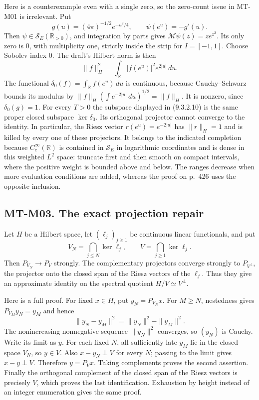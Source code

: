 Here is a counterexample even with a single zero, so the zero-count issue
in MT-M01 is irrelevant.  Put
\[
 g(u)=(4\pi)^{-1/2}e^{-u^2/4},\qquad
 \psi(e^u)=-g'(u).
\]
Then $\psi\in\mathcal S_E(\mathbb R_{>0})$, and integration by parts gives
$\mathcal M\psi(z)=z e^{z^2}$.  Its only zero is $0$, with multiplicity one,
strictly inside the strip for $I=[-1,1]$.  Choose Sobolev index $0$.
The draft's Hilbert norm is then
\[
 \|f\|_H^2=\int_{\mathbb R}|f(e^u)|^2e^{2|u|}\,du.
\]
The functional $\delta_0(f)=\int_{\mathbb R}f(e^u)\,du$ is continuous,
because Cauchy--Schwarz bounds its modulus by
$\|f\|_H(\int e^{-2|u|}\,du)^{1/2}=\|f\|_H$.
It is nonzero, since $\delta_0(g)=1$.  For every $T>0$ the subspace displayed
in (9.3.2.10) is the same proper closed subspace $\ker\delta_0$.
Its orthogonal projector cannot converge to the identity.  In particular,
the Riesz vector $r(e^u)=e^{-2|u|}$ has $\|r\|_H=1$ and is killed by every
one of these projectors.  It belongs to the indicated completion because
$C_c^\infty(\mathbb R)$ is contained in $\mathcal S_E$ in logarithmic
coordinates and is dense in this weighted $L^2$ space: truncate first and
then smooth on compact intervals, where the positive weight is bounded
above and below.  The ranges decrease when more evaluation
conditions are added, whereas the proof on p.~426 uses the opposite
inclusion.

\subsection*{MT-M03. The exact projection repair}
Let $H$ be a Hilbert space, let $(\ell_j)_{j\ge1}$ be continuous linear
functionals, and put
\[
 V_N=\bigcap_{j\le N}\ker\ell_j,\qquad V=\bigcap_{j\ge1}\ker\ell_j.
\]
Then $P_{V_N}\to P_V$ strongly.  The complementary projectors converge
strongly to $P_{V^\perp}$, the projector onto the closed span of the Riesz
vectors of the $\ell_j$.  Thus they give an approximate identity on the
spectral quotient $H/V\simeq V^\perp$.

Here is a full proof.  For fixed $x\in H$, put $y_N=P_{V_N}x$.  For
$M\ge N$, nestedness gives $P_{V_M}y_N=y_M$ and hence
\[
 \|y_N-y_M\|^2=\|y_N\|^2-\|y_M\|^2.
\]
The nonincreasing nonnegative sequence $\|y_N\|^2$ converges, so $(y_N)$ is
Cauchy.  Write its limit as $y$.  For each fixed $N$, all sufficiently late
$y_M$ lie in the closed space $V_N$, so $y\in V$.  Also
$x-y_N\perp V$ for every $N$; passing to the limit gives $x-y\perp V$.
Therefore $y=P_Vx$.  Taking complements proves the second assertion.
Finally the orthogonal complement of the closed span of the Riesz vectors
is precisely $V$, which proves the last identification.  Exhaustion by
height instead of an integer enumeration gives the same proof.

